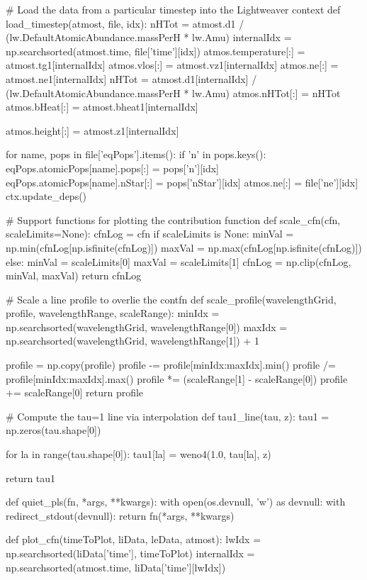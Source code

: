 \begin{pycode}[TimeDepRT]
# Load the data from a particular timestep into the Lightweaver context
def load_timestep(atmost, file, idx):
    nHTot = atmost.d1 / (lw.DefaultAtomicAbundance.massPerH * lw.Amu)
    internalIdx = np.searchsorted(atmost.time, file['time'][idx])
    atmos.temperature[:] = atmost.tg1[internalIdx]
    atmos.vlos[:] = atmost.vz1[internalIdx]
    atmos.ne[:] = atmost.ne1[internalIdx]
    nHTot = atmost.d1[internalIdx] / (lw.DefaultAtomicAbundance.massPerH * lw.Amu)
    atmos.nHTot[:] = nHTot
    atmos.bHeat[:] = atmost.bheat1[internalIdx]

    atmos.height[:] = atmost.z1[internalIdx]

    for name, pops in file['eqPops'].items():
        if 'n' in pops.keys():
            eqPops.atomicPops[name].pops[:] = pops['n'][idx]
        eqPops.atomicPops[name].nStar[:] = pops['nStar'][idx]
    atmos.ne[:] = file['ne'][idx]
    ctx.update_deps()

# Support functions for plotting the contribution function
def scale_cfn(cfn, scaleLimits=None):
    cfnLog = cfn
    if scaleLimits is None:
        minVal = np.min(cfnLog[np.isfinite(cfnLog)])
        maxVal = np.max(cfnLog[np.isfinite(cfnLog)])
    else:
        minVal = scaleLimits[0]
        maxVal = scaleLimits[1]
    cfnLog = np.clip(cfnLog, minVal, maxVal)
    return cfnLog

# Scale a line profile to overlie the contfn
def scale_profile(wavelengthGrid, profile, wavelengthRange, scaleRange):
    minIdx = np.searchsorted(wavelengthGrid, wavelengthRange[0])
    maxIdx = np.searchsorted(wavelengthGrid, wavelengthRange[1]) + 1

    profile = np.copy(profile)
    profile -= profile[minIdx:maxIdx].min()
    profile /= profile[minIdx:maxIdx].max()
    profile *= (scaleRange[1] - scaleRange[0])
    profile += scaleRange[0]
    return profile

# Compute the tau=1 line via interpolation
def tau1_line(tau, z):
    tau1 = np.zeros(tau.shape[0])

    for la in range(tau.shape[0]):
        tau1[la] = weno4(1.0, tau[la], z)

    return tau1

def quiet_pls(fn, *args, **kwargs):
    with open(os.devnull, 'w') as devnull:
        with redirect_stdout(devnull):
            return fn(*args, **kwargs)

def plot_cfn(timeToPlot, liData, leData, atmost):
    lwIdx = np.searchsorted(liData['time'], timeToPlot)
    internalIdx = np.searchsorted(atmost.time, liData['time'][lwIdx])


\end{pycode}
